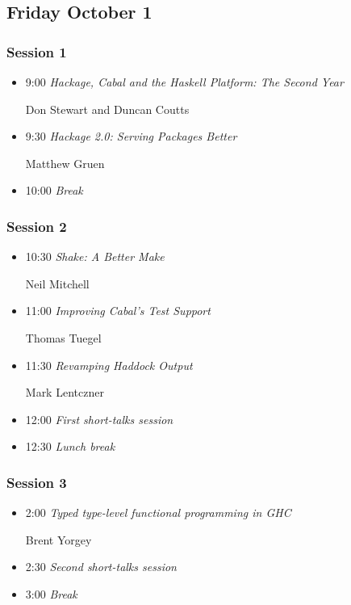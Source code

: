 \documentclass{article}[10pt]
\newenvironment{tightItemize}{
\begin{itemize}
  \setlength{\itemsep}{1pt}
  \setlength{\parskip}{0pt}
  \setlength{\parsep}{0pt}}{\end{itemize}
}
\newcommand{\programDate}[1]{\newpage\subsection*{#1}}
\newcommand{\session}[1]{\subsubsection*{#1}}
\begin{document}
          \programDate{Friday October 1}

          \session{Session 1}

          \begin{tightItemize}
            \item[9:00] \textit{Hackage, Cabal and the Haskell Platform: The Second Year}

            Don Stewart and Duncan Coutts

            \item[9:30] \textit{Hackage 2.0: Serving Packages Better}
              
            Matthew Gruen

            \item[10:00] \textit{Break}
          \end{tightItemize}

          \session{Session 2}

          \begin{tightItemize}
             \item[10:30] \textit{Shake: A Better Make}

             Neil Mitchell
           
             \item[11:00] \textit{Improving Cabal's Test Support}

             Thomas Tuegel
           
             \item[11:30] \textit{Revamping Haddock Output}

             Mark Lentczner
           
             \item[12:00] \textit{First short-talks session}
           
             \item[12:30] \textit{Lunch break}
          \end{tightItemize}

          \session{Session 3}

          \begin{tightItemize}
            \item[2:00] \textit{Typed type-level functional
              programming in GHC}

              Brent Yorgey

            \item[2:30] \textit{Second short-talks session}
              
            \item[3:00] \textit{Break}
          \end{tightItemize}
\end{document}

